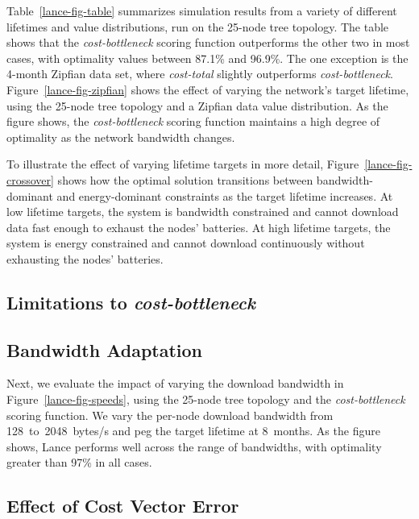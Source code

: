 Table~\ref{lance-fig-table} summarizes simulation results from a variety of
different lifetimes and value distributions, run on the 25-node tree
topology. The table shows that the \textit{cost-bottleneck} scoring function
outperforms the other two in most cases, with optimality values between
87.1\% and 96.9\%. The one exception is the 4-month Zipfian data set, where
\textit{cost-total} slightly outperforms \textit{cost-bottleneck}.
Figure~\ref{lance-fig-zipfian} shows the effect of varying the network's
target lifetime, using the 25-node tree topology and a Zipfian data value
distribution. As the figure shows, the \textit{cost-bottleneck} scoring
function maintains a high degree of optimality as the network bandwidth
changes.

To illustrate the effect of varying lifetime targets in more detail,
Figure~\ref{lance-fig-crossover} shows how the optimal solution transitions
between bandwidth-dominant and energy-dominant constraints as the target
lifetime increases. At low lifetime targets, the system is bandwidth
constrained and cannot download data fast enough to exhaust the nodes'
batteries. At high lifetime targets, the system is energy constrained and
cannot download continuously without exhausting the nodes' batteries.


\subsection{Limitations to \textit{cost-bottleneck}}

\subsection{Bandwidth Adaptation}
\label{lance-sec-eval-params}

Next, we evaluate the impact of varying the download bandwidth in
Figure~\ref{lance-fig-speeds}, using the 25-node tree topology and the
\textit{cost-bottleneck} scoring function. We vary the per-node download
bandwidth from 128~to~2048~bytes/s and peg the target lifetime at 8~months.
As the figure shows, Lance performs well across the range of bandwidths, with
optimality greater than 97\% in all cases.

\subsection{Effect of Cost Vector Error}

